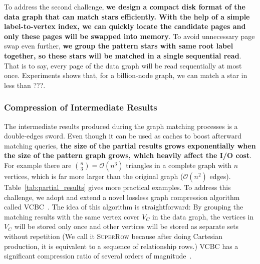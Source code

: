 To address the second challenge, \textbf{we design a compact disk format of the data graph that can match stars efficiently.
With the help of a simple label-to-vertex index, we can quickly locate the candidate pages and only these pages will be swapped into memory}.
To avoid unnecessary page swap even further, \textbf{we group the pattern stars with same root label together,
so these stars will be matched in a single sequential read}.
That is to say, every page of the data graph will be read sequentially at most once.
Experiments shows that, for a billion-node graph, we can match a star in less than \@???.
\subsubsection*{Compression of Intermediate Results}
The intermediate results produced during the graph matching processes is a double-edges sword.
Even though it can be used as caches to boost afterward matching queries,
\textbf{the size of the partial results grows exponentially when the size of the pattern graph grows,
which heavily affect the I/O cost}.
For example there are ${n \choose 3 }= \mathcal{O}(n^3)$ triangles in a complete graph with $n$ vertices,
which is far more larger than the original graph ($\mathcal{O}(n^2)$ edges).
Table~\ref{tab:partial_results} gives more practical examples.
To address this challenge, we adopt and extend a novel lossless graph compression algorithm called VCBC~\cite{DBLP:journals/pvldb/QiaoZC17}.
The idea of this algorithm is straightforward:
By grouping the matching results with the same vertex cover $V_C$ in the data graph,
the vertices in $V_C$ will be stored only once and other vertices will be stored as separate sets without repetition
(We call it \textsc{SuperRow} because after doing Cartesian production, it is equivalent to a sequence of relationship rows.)
VCBC has a significant compression ratio of several orders of magnitude~\cite{DBLP:journals/pvldb/QiaoZC17}.

